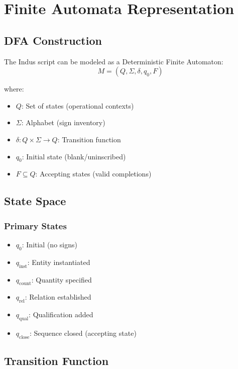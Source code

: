 \section{Finite Automata Representation}

\subsection{DFA Construction}

The Indus script can be modeled as a Deterministic Finite Automaton:
\[
M = (Q, \Sigma, \delta, q_0, F)
\]

where:
\begin{itemize}
    \item $Q$: Set of states (operational contexts)
    \item $\Sigma$: Alphabet (sign inventory)
    \item $\delta: Q \times \Sigma \rightarrow Q$: Transition function
    \item $q_0$: Initial state (blank/uninscribed)
    \item $F \subseteq Q$: Accepting states (valid completions)
\end{itemize}

\subsection{State Space}

\subsubsection{Primary States}
\begin{itemize}
    \item $q_0$: Initial (no signs)
    \item $q_{\text{inst}}$: Entity instantiated
    \item $q_{\text{count}}$: Quantity specified
    \item $q_{\text{rel}}$: Relation established
    \item $q_{\text{qual}}$: Qualification added
    \item $q_{\text{close}}$: Sequence closed (accepting state)
\end{itemize}

\subsection{Transition Function}

